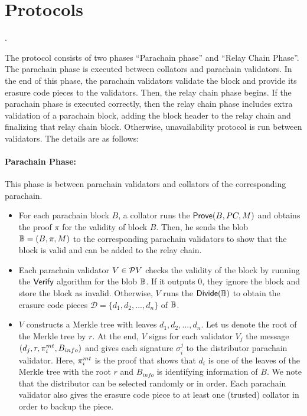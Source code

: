 
\section{Protocols}. 
\label{sec:protocol}




The protocol consists of two phases ``Parachain phase'' and ``Relay Chain Phase''. The parachain phase is executed between collators and parachain validators. In the end of this phase, the parachain validators validate the block and provide its erasure code pieces to the validators. Then, the relay chain phase begins. If the parachain phase is executed correctly, then the relay chain phase includes extra validation of a parachain block, adding the block header to the relay chain and finalizing that relay chain block. Otherwise, unavailability protocol is run between validators. The details are as follows: 

\paragraph{Parachain Phase:} This phase is between parachain validators and collators of the corresponding parachain.

\begin{itemize}
    \item For each parachain block $B$, a collator runs the $\mathsf{Prove}(B,PC,M)$ and obtains the proof $\pi$ for the validity of  block $B$. Then, he sends the blob $\mathbb{B} = (B,\pi,M)$ to the corresponding parachain validators to show that the block is valid and can be added to the relay chain. 
    
    \item Each parachain validator $V \in \mathcal{P}V$ checks the validity of the block by running the $\mathsf{Verify}$ algorithm for the blob $\mathbb{B}$. If it outputs 0, they ignore the block and store the block as invalid. Otherwise, $V$ runs the $\mathsf{Divide}(\mathbb{B})$ to obtain the erasure code pieces $\mathcal{D} = \{d_1,d_2,...,d_n\}$ of $\mathbb{B}$.
    \item $V$ constructs a Merkle tree  with  leaves $d_1,d_2,...,d_n$. Let us denote the root of the Merkle tree by $r$. At the end, $V$ signs for each validator $V_j$ the message $(d_j, r, \pi^{mt}_i, B_{info})$ and gives each signature $\sigma_i^j$ to the distributor parachain validator. Here, $\pi^{mt}_i$ is the proof that shows that $d_i$ is one of the leaves of the Merkle tree with the root $r$ and $B_{info}$ is identifying information of $B$. We note that the distributor can be selected randomly or in order. Each parachain validator also gives the erasure code piece to at least one (trusted) collator in order to backup the piece.
\end{itemize}


